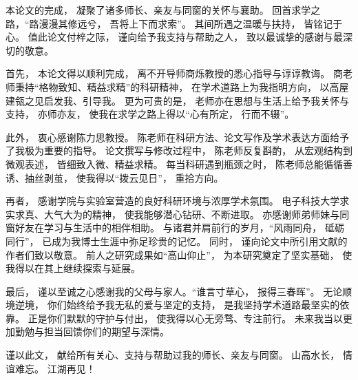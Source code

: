 \documentclass[doctor, vlined]{DissertUESTC}
\begin{document}
	\newcommand{\shad}[1]{\textcolor{red}{\ttfamily #1}}

	
	
	
	\tableofcontents  %
	\listoffigures  %
	\listoftables  %
	
	
	
	
	
	
	


	\acknowledgement
	本论文的完成， 凝聚了诸多师长、亲友与同窗的关怀与襄助。 回首求学之路，“路漫漫其修远兮， 吾将上下而求索”。 其间所遇之温暖与扶持， 皆铭记于心。 值此论文付梓之际， 谨向给予我支持与帮助之人， 致以最诚挚的感谢与最深切的敬意。

首先， 本论文得以顺利完成， 离不开导师商烁教授的悉心指导与谆谆教诲。 商老师秉持“格物致知、精益求精”的科研精神， 在学术道路上为我指明方向， 以高屋建瓴之见启发我、引导我。 更为可贵的是， 老师亦在思想与生活上给予我关怀与支持， 亦师亦友， 使我在求学之路上得以“心有所定， 行而不辍”。

此外， 衷心感谢陈力思教授。 陈老师在科研方法、论文写作及学术表达方面给予了我极为重要的指导。 论文撰写与修改过程中， 陈老师反复斟酌， 从宏观结构到微观表述， 皆细致入微、精益求精。 每当科研遇到瓶颈之时， 陈老师总能循循善诱、抽丝剥茧， 使我得以“拨云见日”， 重拾方向。

再者， 感谢学院与实验室营造的良好科研环境与浓厚学术氛围。 电子科技大学求实求真、大气大为的精神， 使我能够潜心钻研、不断进取。 亦感谢师弟师妹与同窗好友在学习与生活中的相伴相助。 与诸君并肩前行的岁月，“风雨同舟， 砥砺同行”， 已成为我博士生涯中弥足珍贵的记忆。 同时， 谨向论文中所引用文献的作者们致以敬意。 前人之研究成果如“高山仰止”， 为本研究奠定了坚实基础， 使我得以在其上继续探索与延展。

最后， 谨以至诚之心感谢我的父母与家人。“谁言寸草心， 报得三春晖”。 无论顺境逆境， 你们始终给予我无私的爱与坚定的支持， 是我坚持学术道路最坚实的依靠。 正是你们默默的守护与付出， 使我得以心无旁骛、专注前行。 未来我当以更加勤勉与担当回馈你们的期望与深情。

谨以此文， 献给所有关心、支持与帮助过我的师长、亲友与同窗。 山高水长， 情谊难忘。 江湖再见！

	

	
	
\end{document}
